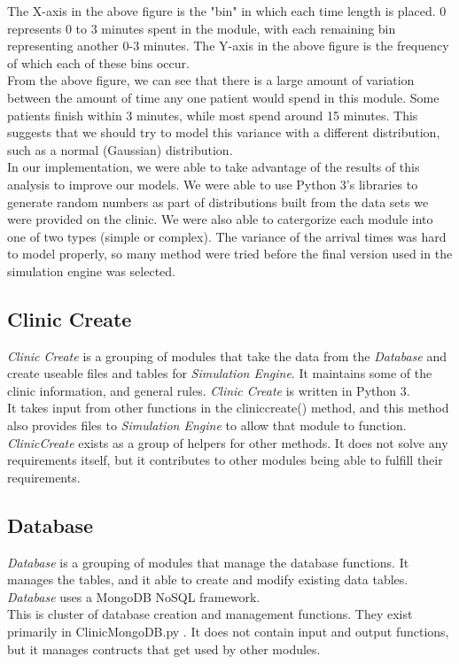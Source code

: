 \documentclass[12pt]{article}
\begin{document}
The X-axis in the above figure is the "bin" in which each time length is placed. 0 represents 0 to 3 minutes spent in the module, with each remaining bin representing another 0-3 minutes. The Y-axis in the above figure is the frequency of which each of these bins occur. \\
From the above figure, we can see that there is a large amount of variation between the amount of time any one patient would spend in this module. Some patients finish within 3 minutes, while most spend around 15 minutes. This suggests that we should try to model this variance with a different distribution, such as a normal (Gaussian) distribution. \\
In our implementation, we were able to take advantage of the results of this analysis to improve our models. We were able to use Python 3's libraries to generate random numbers as part of distributions built from the data sets we were provided on the clinic. We were also able to catergorize each module into one of two types (simple or complex). The variance of the arrival times was hard to model properly, so many method were tried before the final version used in the simulation engine was selected.
\subsection{Clinic Create}
\textit{Clinic Create} is a grouping of modules that take the data from the \textit{Database} and create useable files and tables for \textit{Simulation Engine}. It maintains some of the clinic information, and general rules. \textit{Clinic Create} is written in Python 3.\\
It takes input from other functions in the cliniccreate() method, and this method also provides files to \textit{Simulation Engine} to allow that module to function. \\
\textit{ClinicCreate} exists as a group of helpers for other methods. It does not solve any requirements itself, but it contributes to other modules being able to fulfill their requirements. \\
\subsection{Database}
\textit{Database} is a grouping of modules that manage the database functions. It manages the tables, and it able to create and modify existing data tables. \textit{Database} uses a  MongoDB NoSQL framework. \\
This is cluster of database creation and management functions. They exist primarily in ClinicMongoDB.py . It does not contain input and output functions, but it manages contructs that get used by other modules. \\
\end{document}

